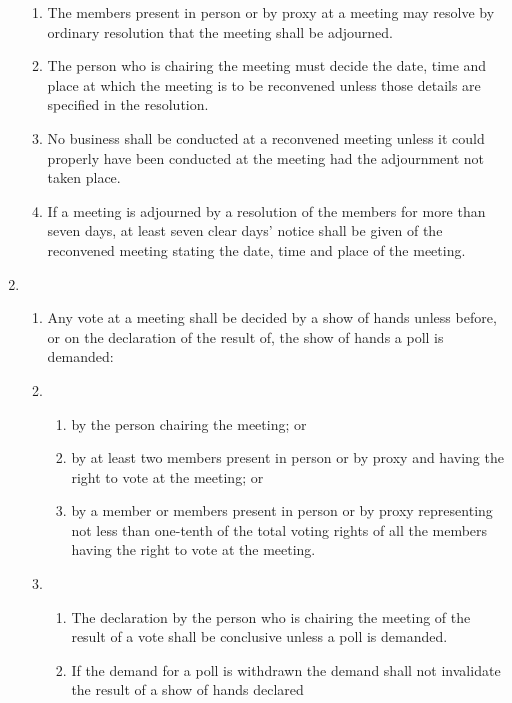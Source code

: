 \documentclass{article}
\begin{document}
\begin{enumerate}[label=\arabic*]
\begin{enumerate}[label=(\arabic*)]
        \item The members present in person or by proxy at a meeting
        may resolve by ordinary resolution that the meeting shall
        be adjourned.
        \item The person who is chairing the meeting must decide the date,
        time and place at which the meeting is to be reconvened unless
        those details are specified in the resolution.
        \item No business shall be conducted at a reconvened meeting unless
        it could properly have been conducted at the meeting had the
        adjournment not taken place.
        \item If a meeting is adjourned by a resolution of the members for
        more than seven days, at least seven clear days’ notice shall
        be given of the reconvened meeting stating the date, time and
        place of the meeting.
    \end{enumerate}
    \item \begin{enumerate}[label=(\arabic*)]
        \item Any vote at a meeting shall be decided by a show of hands
        unless before, or on the declaration of the result of, the show of
        hands a poll is demanded:
        \item \begin{enumerate}[label=(\alph*)]
            \item by the person chairing the meeting; or
            \item by at least two members present in person or by proxy
            and having the right to vote at the meeting; or
            \item by a member or members present in person or by proxy
            representing not less than one-tenth of the total voting
            rights of all the members having the right to vote at
            the meeting.
        \end{enumerate}
        \item \begin{enumerate}[label=(\alph*)]
            \item  The declaration by the person who is chairing the
            meeting of the result of a vote shall be conclusive unless
            a poll is demanded.
            \item If the demand for a poll is withdrawn the demand shall
            not invalidate the result of a show of hands declared

\end{enumerate}
\end{enumerate}
\end{enumerate}
\end{document}
